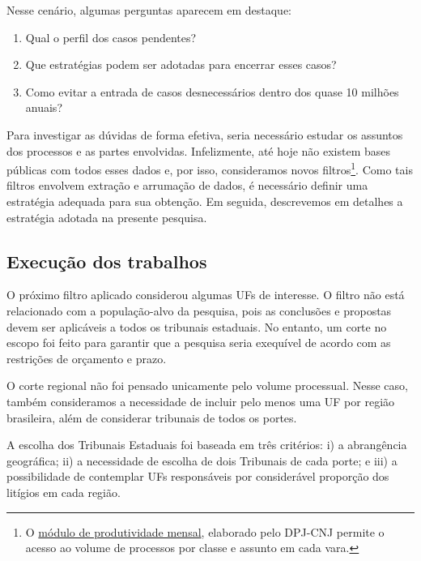 \documentclass[]{report}
\providecommand{\tightlist}{%
  \setlength{\itemsep}{0pt}\setlength{\parskip}{0pt}}
\begin{document}
Nesse cenário, algumas perguntas aparecem em destaque:

\begin{enumerate}
\def\labelenumi{\arabic{enumi}.}
\tightlist
\item
  Qual o perfil dos casos pendentes?
\item
  Que estratégias podem ser adotadas para encerrar esses casos?
\item
  Como evitar a entrada de casos desnecessários dentro dos quase 10
  milhões anuais?
\end{enumerate}

Para investigar as dúvidas de forma efetiva, seria necessário estudar os
assuntos dos processos e as partes envolvidas. Infelizmente, até hoje
não existem bases públicas com todos esses dados e, por isso,
consideramos novos filtros\footnote{O
  \href{http://paineis.cnj.jus.br/QvAJAXZfc/opendoc.htm?document=qvw_l/painelcnj.qvw\&host=QVS\%40neodimio03\&anonymous=true}{módulo
  de produtividade mensal}, elaborado pelo DPJ-CNJ permite o acesso ao
  volume de processos por classe e assunto em cada vara.}. Como tais
filtros envolvem extração e arrumação de dados, é necessário definir uma
estratégia adequada para sua obtenção. Em seguida, descrevemos em
detalhes a estratégia adotada na presente pesquisa.

\subsection{Execução dos trabalhos}\label{execucao-dos-trabalhos}

O próximo filtro aplicado considerou algumas UFs de interesse. O filtro
não está relacionado com a população-alvo da pesquisa, pois as
conclusões e propostas devem ser aplicáveis a todos os tribunais
estaduais. No entanto, um corte no escopo foi feito para garantir que a
pesquisa seria exequível de acordo com as restrições de orçamento e
prazo.

O corte regional não foi pensado unicamente pelo volume processual.
Nesse caso, também consideramos a necessidade de incluir pelo menos uma
UF por região brasileira, além de considerar tribunais de todos os
portes.

A escolha dos Tribunais Estaduais foi baseada em três critérios: i) a
abrangência geográfica; ii) a necessidade de escolha de dois Tribunais
de cada porte; e iii) a possibilidade de contemplar UFs responsáveis por
considerável proporção dos litígios em cada região.
\end{document}
